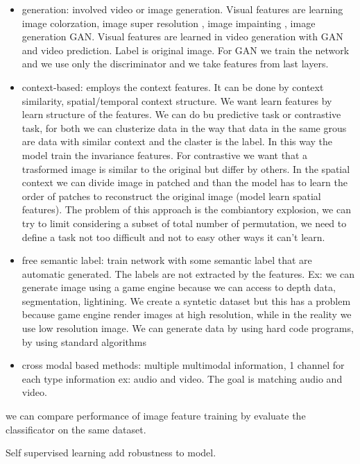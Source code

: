 \begin{itemize}
    \item generation: involved video or image generation. Visual features are learning 
    image colorzation, image super resolution , image impainting , image generation GAN.
    Visual features are learned in video generation with GAN and video prediction.
    Label is original image. For GAN we train the network and we use only the discriminator 
    and we take features from last layers.
    \item context-based: employs the context features. It can be done by context similarity, 
    spatial/temporal context structure. We want learn features by learn structure of 
    the features. We can do bu predictive task or contrastive task, for both we 
    can clusterize data in the way that data in the same grous are data with similar
    context and the claster is the label. In this way the model train the invariance features.
    For contrastive we want that a trasformed image is similar to the original but
    differ by others.  In the spatial context we can divide image in patched and 
    than the model has to learn the order of patches to reconstruct the original
    image (model learn spatial features). The problem of this approach is the 
    combiantory explosion, we can try to limit considering a subset of total number of 
    permutation, we need to define a task not too difficult and not to easy other ways
    it can't learn. 
    \item free semantic label: train network with some semantic label that are automatic 
    generated. The labels are not extracted by the features. Ex: we can generate 
    image using a game engine because we can access to depth data, segmentation, lightining.
    We create a syntetic dataset but this has a problem because game engine render
    images at high resolution, while in the reality we use low resolution image.
    We can generate data by using hard code programs, by using standard algorithms
    \item cross modal based methods: multiple multimodal information, 1 channel for 
    each type information ex: audio and video. The goal is matching audio and video. 
\end{itemize}

we can compare performance of image feature training by evaluate the classificator on 
the same dataset.

Self supervised learning add robustness to model.
